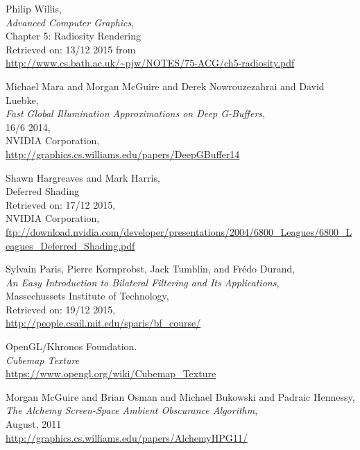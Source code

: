 \begin{thebibliography}{9}

  Philip Willis,\\
  \emph{Advanced Computer Graphics},\\
  Chapter 5: Radiosity Rendering\\
  Retrieved on: 13/12 2015 from\\
  \url{http://www.cs.bath.ac.uk/~pjw/NOTES/75-ACG/ch5-radiosity.pdf}
  


  Michael Mara and Morgan McGuire and Derek Nowrouzezahrai  and David Luebke,\\
  \emph{Fast Global Illumination Approximations on Deep G-Buffers},\\
  16/6 2014,\\
  NVIDIA Corporation,\\
  \url{http://graphics.cs.williams.edu/papers/DeepGBuffer14}
  
	Shawn Hargreaves and Mark Harris,\\
	Deferred Shading \\
	Retrieved on: 17/12 2015,\\
	NVIDIA Corporation,\\
	\url{ftp://download.nvidia.com/developer/presentations/2004/6800_Leagues/6800_Leagues_Deferred_Shading.pdf}

	Sylvain Paris, Pierre Kornprobst, Jack Tumblin, and Frédo Durand,\\
	\emph{An Easy Introduction to Bilateral Filtering and Its Applications},\\
	Massechussets Institute of Technology,\\
	Retrieved on: 19/12 2015,\\
	\url{http://people.csail.mit.edu/sparis/bf_course/}
	
	OpenGL/Khronos Foundation.\\
	\emph{Cubemap Texture}\\
	\url{https://www.opengl.org/wiki/Cubemap_Texture}
	
  Morgan McGuire and Brian Osman and Michael Bukowski and Padraic Hennessy,\\
  \emph{The Alchemy Screen-Space Ambient Obscurance Algorithm},\\
  August, 2011\\
  \url{http://graphics.cs.williams.edu/papers/AlchemyHPG11/}


\end{thebibliography}